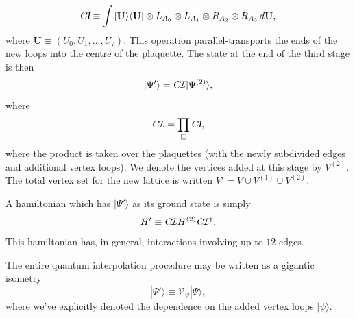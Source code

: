 \documentclass[twocolumn,lengthcheck,superscriptaddress]{revtex4-1}
\theoremstyle{definition}
\theoremstyle{remark}
\begin{document}
\begin{equation}
	\textsl{CI} \equiv \int |\mathbf{U} \rangle\langle \mathbf{U}|\otimes L_{A_0}\otimes L_{A_1} \otimes R_{A_2} \otimes R_{A_3}  \,d\mathbf{U},
\end{equation}
where $\mathbf{U} \equiv (U_0, U_1, \ldots, U_7)$.  This operation parallel-transports the ends of the new loops into the centre of the plaquette. The state at the end of the third stage is then
\begin{equation}
	|\Psi'\rangle = \textsl{C}\mathcal{I}|\Psi^{(2)}\rangle,
\end{equation}
where
\begin{equation}
	\textsl{C}\mathcal{I}= \prod_{\square} \textsl{CI},
\end{equation}
where the product is taken over the plaquettes (with the newly subdivided edges and additional vertex loops). We denote the vertices added at this stage by $V^{(2)}$. The total vertex set for the new lattice is written $V' = V\cup V^{(1)} \cup V^{(2)}$.

A hamiltonian which has $|\Psi'\rangle$ as its ground state is simply
\begin{equation}\label{eq:parent3}
	H' \equiv \textsl{C}\mathcal{I} H^{(2)} \textsl{C}\mathcal{I}^\dag.
\end{equation}
This hamiltonian has, in general, interactions involving up to $12$ edges.

The entire quantum interpolation procedure may be written as a gigantic isometry
\begin{equation}
	|\Psi'\rangle \equiv \mathcal{V}_{\psi} |\Psi\rangle,
\end{equation}
where we've explicitly denoted the dependence on the added vertex loops $|\psi\rangle$. 
\end{document}
